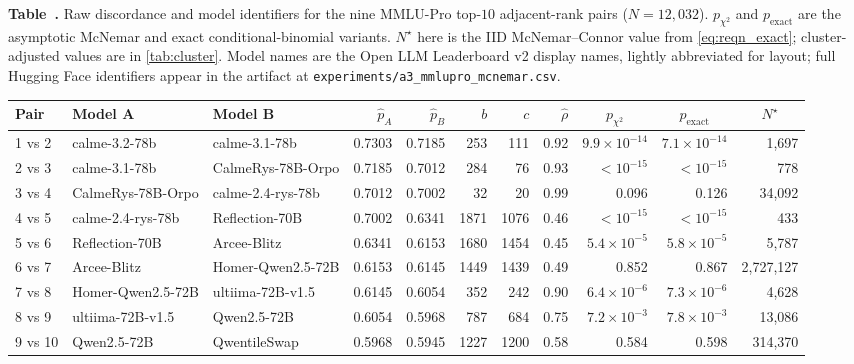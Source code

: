 \documentclass{article}
\theoremstyle{plain}
\theoremstyle{definition}
\begin{document}
\label{tab:discord_mmlupro}%
\begin{center}\footnotesize\vspace{-1ex}
\textbf{Table~\thetable.} Raw discordance and model identifiers for the nine MMLU-Pro top-$10$ adjacent-rank pairs ($N{=}12{,}032$). $p_{\chi^2}$ and $p_{\mathrm{exact}}$ are the asymptotic McNemar and exact conditional-binomial variants. $N^{\star}$ here is the IID McNemar--Connor value from \cref{eq:reqn_exact}; cluster-adjusted values are in \cref{tab:cluster}. Model names are the Open LLM Leaderboard v2 display names, lightly abbreviated for layout; full Hugging Face identifiers appear in the artifact at \texttt{experiments/a3\_mmlupro\_mcnemar.csv}.\\[3pt]
\setlength{\tabcolsep}{4pt}
\begin{tabular}{@{}lllrrrrr@{\hspace{0.7em}}r@{\hspace{0.7em}}r@{\hspace{0.7em}}r@{}}
\toprule
Pair & Model A & Model B & $\hat p_A$ & $\hat p_B$ & $b$ & $c$ & $\hat\rho$ & \multicolumn{1}{c}{$p_{\chi^2}$} & \multicolumn{1}{c}{$p_{\mathrm{exact}}$} & \multicolumn{1}{c}{$N^{\star}$} \\
\midrule
1 vs 2 & calme-3.2-78b      & calme-3.1-78b      & 0.7303 & 0.7185 & 253  & 111  & 0.92 & $9.9{\times}10^{-14}$ & $7.1{\times}10^{-14}$ & 1{,}697 \\
2 vs 3 & calme-3.1-78b      & CalmeRys-78B-Orpo  & 0.7185 & 0.7012 & 284  & 76   & 0.93 & ${<}10^{-15}$ & ${<}10^{-15}$ & 778 \\
3 vs 4 & CalmeRys-78B-Orpo  & calme-2.4-rys-78b  & 0.7012 & 0.7002 & 32   & 20   & 0.99 & 0.096 & 0.126 & 34{,}092 \\
4 vs 5 & calme-2.4-rys-78b  & Reflection-70B     & 0.7002 & 0.6341 & 1871 & 1076 & 0.46 & ${<}10^{-15}$ & ${<}10^{-15}$ & 433 \\
5 vs 6 & Reflection-70B     & Arcee-Blitz        & 0.6341 & 0.6153 & 1680 & 1454 & 0.45 & \mbox{$5.4\times10^{-5}$} & \mbox{$5.8\times10^{-5}$} & \mbox{5{,}787} \\
6 vs 7 & Arcee-Blitz        & Homer-Qwen2.5-72B  & 0.6153 & 0.6145 & 1449 & 1439 & 0.49 & \mbox{0.852} & \mbox{0.867} & \mbox{2{,}727{,}127} \\
7 vs 8 & Homer-Qwen2.5-72B  & ultiima-72B-v1.5   & 0.6145 & 0.6054 & 352  & 242  & 0.90 & \mbox{$6.4\times10^{-6}$} & \mbox{$7.3\times10^{-6}$} & \mbox{4{,}628} \\
8 vs 9 & ultiima-72B-v1.5   & Qwen2.5-72B        & 0.6054 & 0.5968 & 787  & 684  & 0.75 & \mbox{$7.2\times10^{-3}$} & \mbox{$7.8\times10^{-3}$} & \mbox{13{,}086} \\
9 vs 10 & Qwen2.5-72B        & QwentileSwap       & 0.5968 & 0.5945 & 1227 & 1200 & 0.58 & 0.584 & 0.598 & 314{,}370 \\
\bottomrule
\end{tabular}
\end{center}
\end{document}
